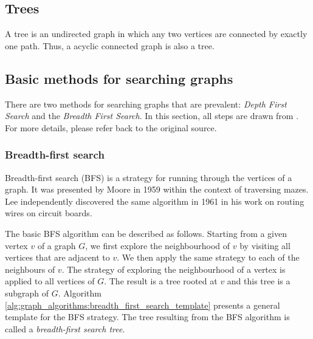 \subsection{Trees}

A tree is an undirected graph in which any two vertices are connected by exactly one path. 
Thus, a acyclic connected graph is also a tree.


\subsection{Basic methods for searching graphs}


There are two methods for searching graphs that are prevalent: \emph{Depth First Search} and the \emph{Breadth First Search}.
In this section, all steps are drawn from \cite{joyner2010algorithmic}.
For more details, please refer back to the original source.


\subsubsection{Breadth-first search}

Breadth-first search (BFS) is a strategy for running through the
vertices of a graph. 
It was presented by Moore \cite{moore1959shortest} in 1959 within the context of traversing mazes. 
Lee \cite{lee1961algorithm} independently discovered the same algorithm in 1961 in his work on routing wires on circuit boards.

The basic BFS algorithm can be described as follows. 
Starting from a given vertex $v$ of a graph $G$, we first explore the neighbourhood of $v$ by visiting all vertices that are adjacent to $v$. 
We then apply the same strategy to each of the neighbours of $v$. The strategy of exploring the neighbourhood of a vertex is applied to all vertices of $G$. 
The result is a tree rooted at $v$ and this tree is a subgraph of
$G$. 
Algorithm~ \ref{alg:graph_algorithms:breadth_first_search_template}
presents a general template for the BFS strategy. The tree resulting
from the BFS algorithm is called a \emph{breadth-first search tree}.

